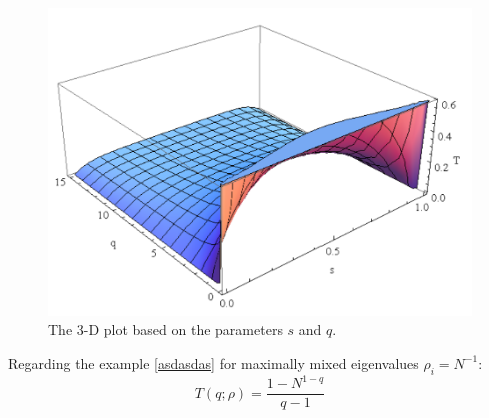 \begin{itemize}
\begin{figure}[H]
\begin{center}
\includegraphics[scale=0.8]{figures/tsallis_ent_plot_3D.png}
\caption{The 3-D plot based on the parameters $s$ and $q$.}\label{figuridiont2}
\end{center}
\end{figure}
Regarding the example \eqref{asdasdas} for maximally mixed eigenvalues $\rho_i=N^{-1}$:
\begin{equation}
T(q;\rho)=\frac{1-N^{1-q}}{q-1}
\end{equation}
\end{itemize}
